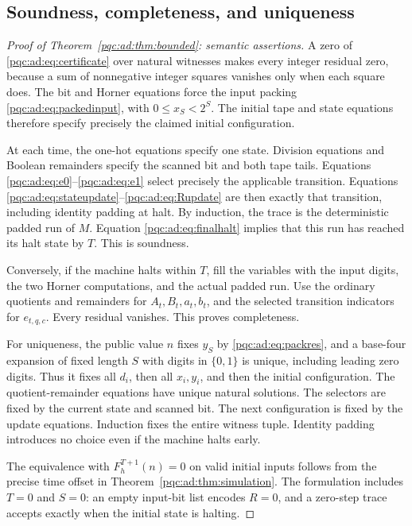 \documentclass[11pt,letterpaper]{article}
\numberwithin{equation}{section}
\theoremstyle{definition}
\theoremstyle{remark}
\newcommand{\Bit}{\{0,1\}}
\begin{document}
\subsection{Soundness, completeness, and uniqueness}
\begin{proof}[Proof of Theorem~\ref{pqc:ad:thm:bounded}: semantic assertions]
A zero of \eqref{pqc:ad:eq:certificate} over natural witnesses makes every
integer residual zero, because a sum of nonnegative integer squares
vanishes only when each square does. The bit and Horner equations force
the input packing \eqref{pqc:ad:eq:packedinput}, with $0\le x_S<2^S$. The initial
tape and state equations therefore specify precisely the claimed initial
configuration.

At each time, the one-hot equations specify one state. Division equations
and Boolean remainders specify the scanned bit and both tape tails.
Equations \eqref{pqc:ad:eq:e0}--\eqref{pqc:ad:eq:e1} select precisely the applicable
transition. Equations \eqref{pqc:ad:eq:stateupdate}--\eqref{pqc:ad:eq:Rupdate} are then
exactly that transition, including identity padding at halt. By induction,
the trace is the deterministic padded run of $M$. Equation
\eqref{pqc:ad:eq:finalhalt} implies that this run has reached its halt state by
$T$. This is soundness.

Conversely, if the machine halts within $T$, fill the variables with the
input digits, the two Horner computations, and the actual padded run.
Use the ordinary quotients and remainders for $A_t,B_t,a_t,b_t$, and the
selected transition indicators for $e_{t,q,c}$. Every residual vanishes.
This proves completeness.

For uniqueness, the public value $n$ fixes $y_S$ by
\eqref{pqc:ad:eq:packres}, and a base-four expansion of fixed length $S$ with
digits in $\Bit$ is unique, including leading zero digits. Thus it fixes
all $d_i$, then all $x_i,y_i$, and then the initial configuration. The
quotient-remainder equations have unique natural solutions. The selectors
are fixed by the current state and scanned bit. The next configuration is
fixed by the update equations. Induction fixes the entire witness tuple.
Identity padding introduces no choice even if the machine halts early.

The equivalence with $F_h^{T+1}(n)=0$ on valid initial inputs follows from
the precise time offset in Theorem~\ref{pqc:ad:thm:simulation}. The formulation
includes $T=0$ and $S=0$: an empty input-bit list encodes $R=0$, and a
zero-step trace accepts exactly when the initial state is halting.
\end{proof}
\end{document}
